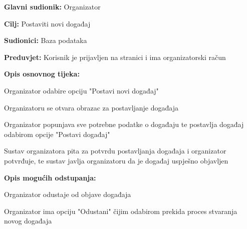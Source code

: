 					\noindent {}
\begin{packed_item}
	\item \textbf{Glavni sudionik:} Organizator
	\item  \textbf{Cilj:} Postaviti novi događaj
	\item  \textbf{Sudionici:} Baza podataka
	\item  \textbf{Preduvjet:} Korisnik je prijavljen na stranici i ima organizatorski račun
	\item  \textbf{Opis osnovnog tijeka:}
	
	\item[] \begin{packed_enum}
		
		\item Organizator odabire opciju "Postavi novi događaj"
		\item Organizatoru se otvara obrazac za postavljanje događaja
		\item Organizator popunjava sve potrebne podatke o događaju te postavlja događaj odabirom opcije "Postavi događaj"
		\item Sustav organizatora pita za potvrdu postavljanja događaja i organizator potvrđuje, te sustav javlja organizatoru da je događaj uspješno objavljen
	\end{packed_enum}
	
	\item  \textbf{Opis mogućih odstupanja:}
	
	\item[] \begin{packed_item}
		
		\item[4.a] Organizator odustaje od objave događaja
		\item[] \begin{packed_enum}
			
			\item Organizator ima opciju "Odustani" čijim odabirom prekida proces stvaranja novog događaja
			
		\end{packed_enum}
	\end{packed_item}
\end{packed_item}

